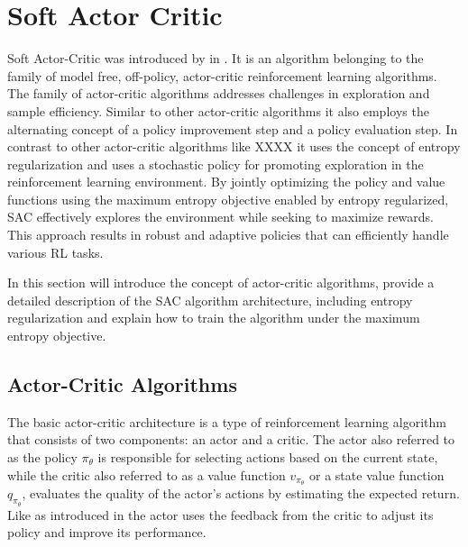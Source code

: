 \section{Soft Actor Critic}\label{sec:SAC}

Soft Actor-Critic was introduced by  in . It is an algorithm belonging to the family of model free, off-policy, actor-critic reinforcement learning algorithms. The family of actor-critic algorithms addresses challenges in exploration and sample efficiency. Similar to  other actor-critic algorithms it also employs the alternating concept of a policy improvement step and a policy evaluation step. In contrast to other actor-critic algorithms like XXXX  it uses the concept of entropy regularization and uses a stochastic policy for promoting exploration in the reinforcement learning environment. 
By jointly optimizing the policy and value functions using the maximum entropy objective enabled by entropy regularized, SAC effectively explores the environment while seeking to maximize rewards. This approach results in robust and adaptive policies that can efficiently handle various RL tasks. 

In this section will introduce the concept of actor-critic algorithms, provide a detailed description of the SAC algorithm architecture, including entropy regularization and explain how to train the algorithm under the maximum entropy objective. 


\subsection{Actor-Critic Algorithms}

The basic actor-critic architecture is a type of reinforcement learning algorithm that consists of two components: an actor and a critic. The actor also referred to as the policy $\pi_\theta$ is responsible for selecting actions based on the current state, while the critic also referred to as a value function $v_{\pi_\theta}$ or a state value function $q_{\pi_\theta}$, evaluates the quality of the actor's actions by estimating the expected return. Like as introduced in  the actor uses the feedback from the critic to adjust its policy and improve its performance.


